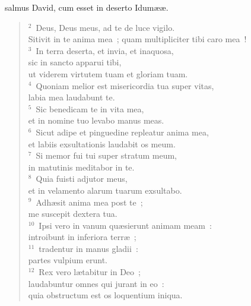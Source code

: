 \bchapter
{}salmus David, cum esset in deserto Idum\ae \ae .
\begin{flushleft}\begin{verse}\vspace{6pt}${}^{2}$~Deus, Deus meus, ad te de luce vigilo.\\ Sitivit in te anima mea~; quam multipliciter tibi caro mea~!\\
${}^{3}$~In terra deserta, et invia, et inaquosa,\\ sic in sancto apparui tibi,\\ ut viderem virtutem tuam et gloriam tuam.\\
${}^{4}$~Quoniam melior est misericordia tua super vitas,\\ labia mea laudabunt te.\\
${}^{5}$~Sic benedicam te in vita mea,\\ et in nomine tuo levabo manus meas.\\
${}^{6}$~Sicut adipe et pinguedine repleatur anima mea,\\ et labiis exsultationis laudabit os meum.\\
${}^{7}$~Si memor fui tui super stratum meum,\\ in matutinis meditabor in te.\\
${}^{8}$~Quia fuisti adjutor meus,\\ et in velamento alarum tuarum exsultabo.\\
${}^{9}$~Adh\ae sit anima mea post te~;\\ me suscepit dextera tua.\\
${}^{10}$~Ipsi vero in vanum qu\ae sierunt animam meam~:\\ introibunt in inferiora terr\ae~;\\
${}^{11}$~tradentur in manus gladii~:\\ partes vulpium erunt.\\
${}^{12}$~Rex vero l\ae tabitur in Deo~;\\ laudabuntur omnes qui jurant in eo~:\\ quia obstructum est os loquentium iniqua.\end{verse}\end{flushleft}



